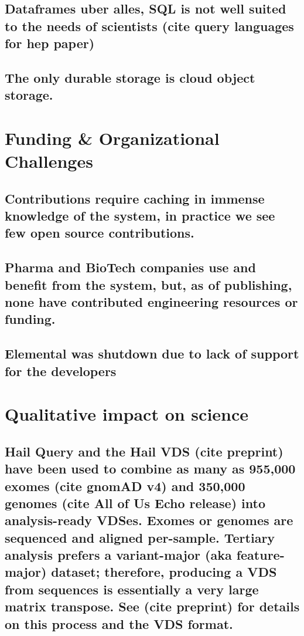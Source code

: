 \documentclass[sigconf, nonacm]{acmart}
\begin{document}
\subsection{Dataframes uber alles, SQL is not well suited to the needs of scientists (cite query languages for hep paper)}

\subsection{The only durable storage is cloud object storage.}

\section{Funding \& Organizational Challenges}

\subsection{Contributions require caching in immense knowledge of the system, in practice we see few open source contributions.}

\subsection{Pharma and BioTech companies use and benefit from the system, but, as of publishing, none have contributed engineering resources or funding.}

\subsection{Elemental was shutdown due to lack of support for the developers}

\section{Qualitative impact on science}

\subsection{Hail Query and the Hail VDS (cite preprint) have been used to combine as many as 955,000 exomes (cite gnomAD v4) and 350,000 genomes (cite All of Us Echo release) into analysis-ready VDSes. Exomes or genomes are sequenced and aligned per-sample. Tertiary analysis prefers a variant-major (aka feature-major) dataset; therefore, producing a VDS from sequences is essentially a very large matrix transpose. See (cite preprint) for details on this process and the VDS format.}
\end{document}
